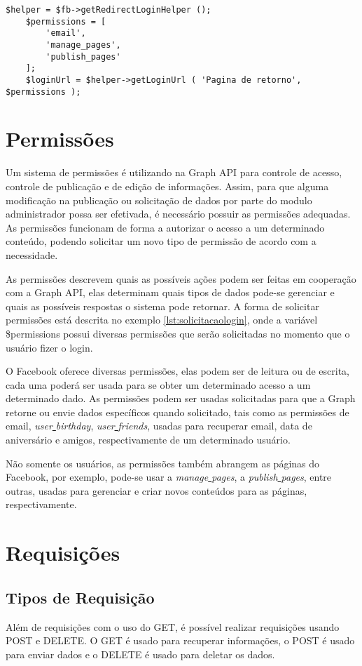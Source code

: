 \begin{lstlisting}[caption={Solicitação de Login},label={lst:solicitacaologin}]
	$helper = $fb->getRedirectLoginHelper ();
	$permissions = [
		'email',
		'manage_pages',
		'publish_pages'
	];
	$loginUrl = $helper->getLoginUrl ( 'Pagina de retorno', $permissions );
\end{lstlisting}

\section{Permissões}
\label{sec:permissoes}
Um sistema de permissões é utilizando na Graph API para controle de acesso, controle de publicação e de edição de informações. Assim, para que alguma modificação na publicação ou solicitação de dados por parte do modulo administrador possa ser efetivada, é necessário possuir as permissões adequadas. As permissões funcionam de forma a autorizar o acesso a um determinado conteúdo, podendo solicitar um novo tipo de permissão de acordo com a necessidade.

As permissões descrevem quais as possíveis ações podem ser feitas em cooperação com a Graph API, elas determinam quais tipos de dados pode-se gerenciar e quais as possíveis respostas o sistema pode retornar. A forma de solicitar permissões está descrita no exemplo \ref{lst:solicitacaologin}, onde a variável \$permissions possui diversas permissões que serão solicitadas no momento que o usuário fizer o login.

O Facebook oferece diversas permissões, elas podem ser de leitura ou de escrita, cada uma poderá ser usada para se obter um determinado acesso a um determinado dado. As permissões podem ser usadas solicitadas para que a Graph retorne ou envie dados específicos quando solicitado, tais como as permissões de email, \textit{user\underline{{ }}birthday}, \textit{user\underline{{ }}friends}, usadas para recuperar email, data de aniversário e amigos, respectivamente de um determinado usuário.

Não somente os usuários, as permissões também abrangem as páginas do Facebook, por exemplo, pode-se usar a \textit{manage\underline{{ }}pages}, a \textit{publish\underline{{ }}pages}, entre outras, usadas para gerenciar e criar novos conteúdos para as páginas, respectivamente.

\section{Requisições}
\subsection{Tipos de Requisição}
Além de requisições com o uso do GET, é possível realizar requisições usando POST e DELETE. O GET é usado para recuperar informações, o POST é usado para enviar dados e o DELETE é usado para deletar os dados.

